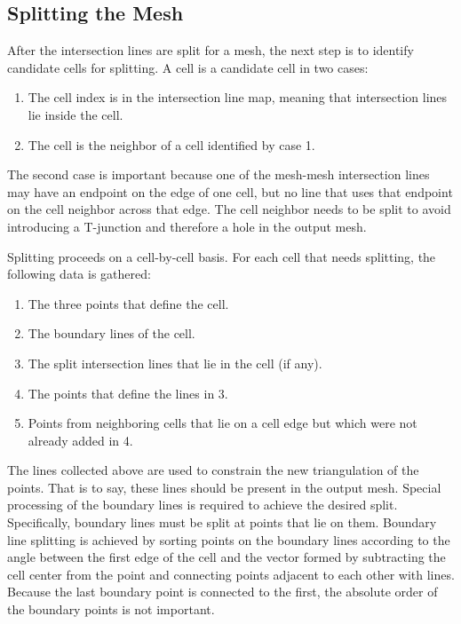 \documentclass{InsightArticle}
\begin{document}
\subsection{Splitting the Mesh}

After the intersection lines are split for a mesh, the next step is to identify candidate cells for splitting. A cell is a candidate cell in two cases:

\begin{enumerate}
\item The cell index is in the intersection line map, meaning that intersection lines lie inside the cell.
\item The cell is the neighbor of a cell identified by case 1.
\end{enumerate}

The second case is important because one of the mesh-mesh intersection lines may have an endpoint on the edge of one cell, but no line that uses that endpoint on the cell neighbor across that edge. The cell neighbor needs to be split to avoid introducing a T-junction and therefore a hole in the output mesh.

Splitting proceeds on a cell-by-cell basis. For each cell that needs splitting, the following data is gathered:

\begin{enumerate}
\item The three points that define the cell.
\item The boundary lines of the cell.
\item The split intersection lines that lie in the cell (if any).
\item The points that define the lines in 3.
\item Points from neighboring cells that lie on a cell edge but which were not already added in 4.
\end{enumerate}

The lines collected above are used to constrain the new triangulation of the points. That is to say, these lines should be present in the output mesh. Special processing of the boundary lines is required to achieve the desired split. Specifically, boundary lines must be split at points that lie on them. Boundary line splitting is achieved by sorting points on the boundary lines according to the angle between the first edge of the cell and the vector formed by subtracting the cell center from the point and connecting points adjacent to each other with lines. Because the last boundary point is connected to the first, the absolute order of the boundary points is not important.
\end{document}
